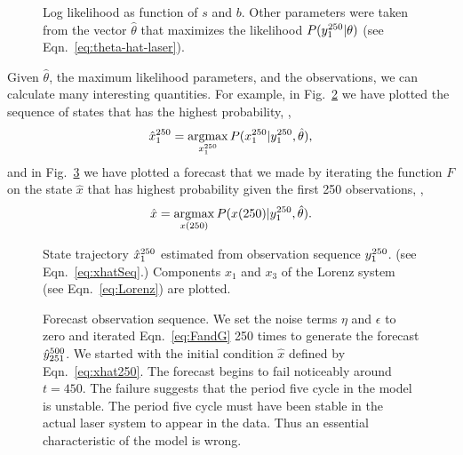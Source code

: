 \begin{figure}[htbp]
  \caption[Log likelihood as function of $s$ and $b$.]%
  {Log likelihood as function of $s$ and $b$.  Other parameters were
    taken from the vector $\hat \theta$ that maximizes the likelihood
    $P(y_{1}^{250}|\theta)$ (see Eqn.~\eqref{eq:theta-hat-laser}).}
  \label{fig:LaserLogLike}
\end{figure}

Given $\hat \theta$, the maximum likelihood parameters, and the
observations, we can calculate many interesting quantities.  For
example, in Fig.~\ref{fig:LaserStates} we have plotted the sequence of
states that has the highest probability, \ie,
\begin{equation}
  \label{eq:xhatSeq}
  \hat x_{1}^{250} = \operatorname*{argmax}_{x_{1}^{250}}
  P(x_{1}^{250}|y_{1}^{250},\hat \theta),
\end{equation}
and in Fig.~\ref{fig:LaserForecast} we have plotted a forecast that we
made by iterating the function $F$ on the state $\hat x$ that has
highest probability given the first 250 observations, \ie,
\begin{equation}
  \label{eq:xhat250}
  \hat x = \operatorname*{argmax}_{{x}{(250)}} P({x}{(250)}|y_{1}^{250},\hat \theta).
\end{equation}

\begin{figure}[htbp]
  \caption[State trajectory $\ts{\hat x}{1}{250}$.]%
  {State trajectory $\ts{\hat x}{1}{250}$ estimated from
    observation sequence $y_{1}^{250}$. (see
    Eqn.~\eqref{eq:xhatSeq}.)  Components $x_1$ and $x_3$ of the
    Lorenz system (see Eqn.~\eqref{eq:Lorenz}) are plotted.}
  \label{fig:LaserStates}
\end{figure}

\begin{figure}[htbp]
  \caption[Forecast observation
  sequence.]%
  {Forecast observation sequence.  We set the noise terms $\eta$ and
    $\epsilon$ to zero and iterated Eqn.~\eqref{eq:FandG} 250 times to
    generate the forecast $\hat y_{251}^{500}$.  We started with
    the initial condition $\hat x$ defined by Eqn.~\eqref{eq:xhat250}.
    The forecast begins to fail noticeably around $t=450$.  The failure
    suggests that the period five cycle in the model is unstable.  The
    period five cycle must have been stable in the actual laser system
    to appear in the data.  Thus an essential characteristic of the
    model is wrong.}
  \label{fig:LaserForecast}
\end{figure}


